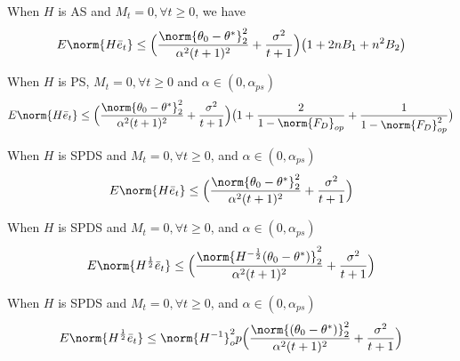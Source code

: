 \begin{theorem}[AS-AN]
When $H$ is AS and $M_t=0,\forall t\geq 0$, we have
\begin{align}
E\norm{H\eb_t}\leq \Big(\frac{\norm{\theta_0-\ts}^2_2}{\alpha^2(t+1)^2}+\frac{\sigma^2}{t+1}\Big)\big(1+2nB_1+n^2B_2\big)
\end{align}
\end{theorem}
\begin{theorem}[PS-AN]
When $H$ is PS, $M_t=0,\forall t\geq 0$ and $\alpha\in (0,\alpha_{ps})$
\begin{align}
E\norm{H\eb_t}\leq \Big(\frac{\norm{\theta_0-\ts}^2_2}{\alpha^2(t+1)^2}+\frac{\sigma^2}{t+1}\Big)\big(1+\frac{2}{1-\norm{F_D}_{op}}+\frac{1}{1-\norm{F_D}^2_{op}}\big)
\end{align}
\end{theorem}
\begin{theorem}[SPDS-AN]
When $H$ is SPDS and $M_t=0,\forall t\geq 0$, and $\alpha\in (0,\alpha_{ps})$
\begin{align}
E\norm{H\eb_t}\leq \Big(\frac{\norm{\theta_0-\ts}^2_2}{\alpha^2(t+1)^2}+\frac{\sigma^2}{t+1}\Big)
\end{align}
\end{theorem}
\begin{theorem}
When $H$ is SPDS and $M_t=0,\forall t\geq 0$, and $\alpha\in (0,\alpha_{ps})$
\begin{align}
E\norm{H^{\frac{1}{2}}\eb_t}\leq \Big(\frac{\norm{H^{-\frac{1}{2}}(\theta_0-\ts)}^2_2}{\alpha^2(t+1)^2}+\frac{\sigma^2}{t+1}\Big)
\end{align}
\end{theorem}
\begin{theorem}
When $H$ is SPDS and $M_t=0,\forall t\geq 0$, and $\alpha\in (0,\alpha_{ps})$
\begin{align}
E\norm{H^{\frac{1}{2}}\eb_t}\leq \norm{H^{-1}}^2_op\Big(\frac{\norm{(\theta_0-\ts)}^2_2}{\alpha^2(t+1)^2}+\frac{\sigma^2}{t+1}\Big)
\end{align}
\end{theorem}


